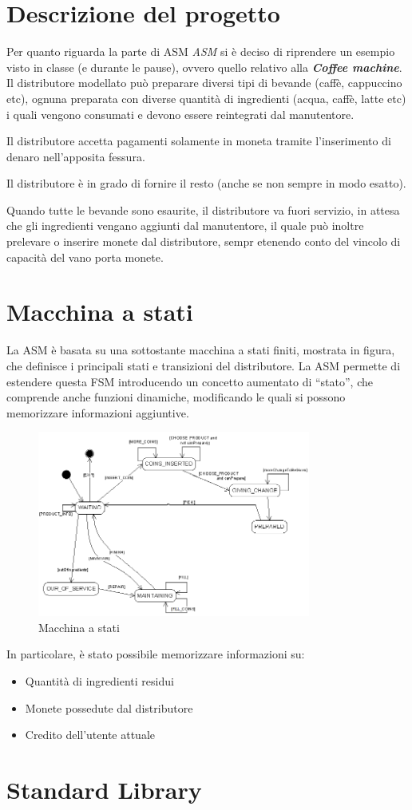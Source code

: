 \section{Descrizione del progetto}
Per quanto riguarda la parte di ASM  \textit{ASM} si è deciso di riprendere un esempio visto in classe (e durante le pause), ovvero quello relativo alla \textit{\textbf{Coffee machine}}.
Il distributore modellato può preparare diversi tipi di bevande (caffè, cappuccino etc), ognuna preparata con diverse quantità di ingredienti (acqua, caffè, latte etc) i quali vengono consumati e devono essere reintegrati dal manutentore.	

Il distributore accetta pagamenti solamente in moneta tramite l'inserimento di denaro nell'apposita fessura.

Il distributore è in grado di fornire il resto (anche se non sempre in modo esatto).

Quando tutte le bevande sono esaurite, il distributore va fuori servizio, in attesa che gli ingredienti vengano aggiunti dal manutentore, il quale può inoltre prelevare o inserire monete dal distributore, sempr etenendo conto del vincolo di capacità del vano porta monete.

\section{Macchina a stati}
La ASM è basata su una sottostante macchina a stati finiti, mostrata in figura, che definisce i principali stati e transizioni del distributore. La ASM permette di estendere questa FSM introducendo un concetto aumentato di “stato”, che comprende anche funzioni dinamiche, modificando le quali si possono memorizzare informazioni aggiuntive.

\begin{figure}[h]
	\centering
	\includegraphics[width=0.8\textwidth]{Immagini/FSM.png}
	\caption{Macchina a stati}
	\label{fig:StateMachine}
\end{figure}

In particolare, è stato possibile memorizzare informazioni su:
\begin{itemize}
	\item Quantità di ingredienti residui
	\item Monete possedute dal distributore
	\item Credito dell'utente attuale
\end{itemize}

\section{Standard Library}



